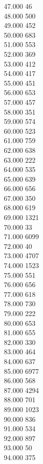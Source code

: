 { 47.000	46 \\
 48.000	500 \\
 49.000	452 \\
 50.000	683 \\
 51.000	553 \\
 52.000	369 \\
 53.000	412 \\
 54.000	417 \\
 55.000	451 \\
 56.000	653 \\
 57.000	457 \\
 58.000	351 \\
 59.000	574 \\
 60.000	523 \\
 61.000	759 \\
 62.000	638 \\
 63.000	222 \\
 64.000	535 \\
 65.000	639 \\
 66.000	656 \\
 67.000	350 \\
 68.000	619 \\
 69.000	1321 \\
 70.000	33 \\
 71.000	6099 \\
 72.000	40 \\
 73.000	4707 \\
 74.000	1523 \\
 75.000	551 \\
 76.000	656 \\
 77.000	618 \\
 78.000	730 \\
 79.000	222 \\
 80.000	653 \\
 81.000	655 \\
 82.000	330 \\
 83.000	464 \\
 84.000	637 \\
 85.000	6977 \\
 86.000	568 \\
 87.000	4294 \\
 88.000	701 \\
 89.000	1023 \\
 90.000	836 \\
 91.000	534 \\
 92.000	897 \\
 93.000	50 \\
 94.000	375 \\
}
